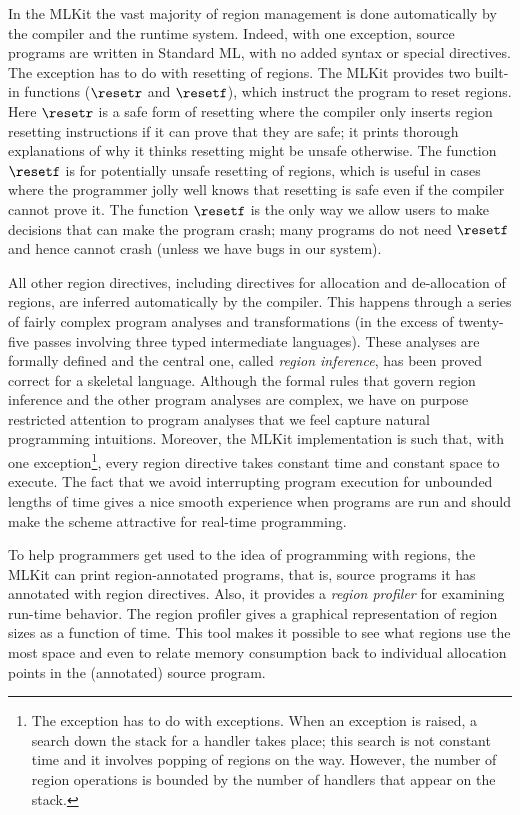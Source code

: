 \documentclass[12pt]{book}
\begin{document}
In the MLKit the vast majority of region management is done
automatically by the compiler and the runtime system.  Indeed, with
one exception, source programs are written in Standard ML, with no
added syntax or special directives. The exception has to do with
resetting of regions. The MLKit provides two built-in functions
%
%
($\resetr$ and $\resetf$), which instruct the program to reset
regions. Here $\resetr$ is a safe form of resetting where the compiler
only inserts region resetting instructions if it can prove that they
are safe; it prints thorough explanations of why it thinks resetting
might be unsafe otherwise. The function $\resetf$ is for potentially
unsafe resetting of regions, which is useful in cases where the
programmer jolly well knows that resetting is safe even if the
compiler cannot prove it. The function $\resetf$ is the only way we
allow users to make decisions that can make the program crash; many
programs do not need $\resetf$ and hence cannot crash (unless we have
bugs in our system).

All other region directives, including directives for allocation and
de-allocation of regions, are inferred automatically by the compiler.
This happens through a series of fairly complex program analyses and
transformations (in the excess of twenty-five passes involving three
typed intermediate languages). These analyses are formally defined and
the central one, called
%
{\em region inference}, has been proved correct for a skeletal
language. Although the formal rules that govern region inference and
the other program analyses are complex, we have on purpose restricted
attention to program analyses that we feel capture natural programming
intuitions.  Moreover, the MLKit implementation is such that, with one
exception\footnote{The exception has to do with exceptions. When an
  exception is raised, a search down the stack for a handler takes
  place; this search is not constant time and it involves popping of
  regions on the way. However, the number of region operations is
  bounded by the number of handlers that appear on the stack.}, every
region directive takes constant time and constant space to execute.
The fact that we avoid interrupting program execution for unbounded
lengths of time gives a nice smooth experience when programs are run
and should make the scheme attractive for real-time programming.

To help programmers get used to the idea of programming with regions,
the MLKit can print region-annotated programs, that is, source programs
it has annotated with region directives. Also, it provides a
%
{\em region profiler\/} for examining run-time behavior.  The region
profiler gives a graphical representation of region sizes as a
function of time. This tool makes it possible to see what regions use
the most space and even to relate memory consumption back to
individual allocation points in the (annotated) source program.
\end{document}
